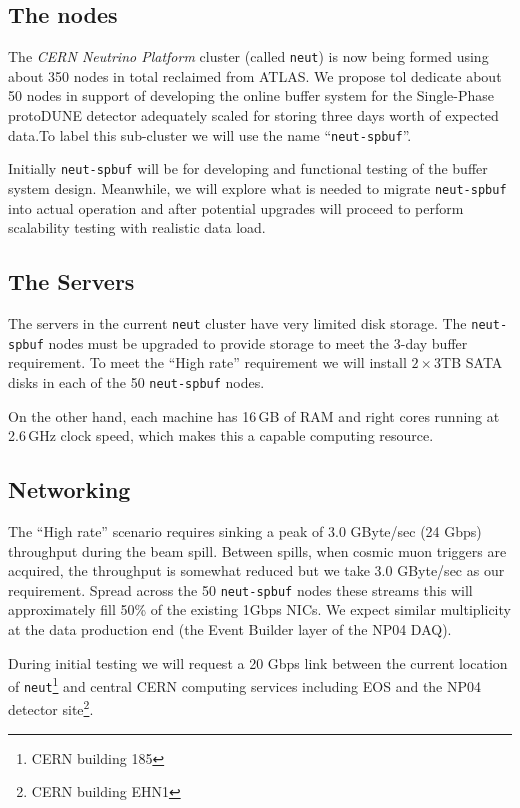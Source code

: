 \documentclass[pdftex,12pt,letter]{article}
\begin{document}
\subsection{The nodes}

The \textit{CERN Neutrino Platform} cluster (called \texttt{neut}) is now being formed using about 350 nodes in
total reclaimed from ATLAS.  We propose tol dedicate about 50 nodes in
support of developing the online buffer system for the Single-Phase
protoDUNE detector adequately scaled for storing three days worth of
expected data.To label this sub-cluster we will use the name ``\texttt{neut-spbuf}''.

Initially \texttt{neut-spbuf} will be for developing and functional testing of the buffer system design. 
Meanwhile, we will explore what is needed to migrate \texttt{neut-spbuf} into actual
operation and after potential upgrades will proceed to perform scalability testing with realistic data load.

\subsection{The Servers}

The servers in the current \texttt{neut} cluster have very limited disk storage.  The
\texttt{neut-spbuf} nodes must be upgraded to provide storage to meet
the 3-day buffer requirement. To meet the ``High rate'' requirement we
will install $2\times 3$TB SATA disks in each of the 50
\texttt{neut-spbuf} nodes.

On the other hand, each machine has 16\,GB of RAM and right cores running at 2.6\,GHz clock speed,
which makes this a capable computing resource.

\subsection{Networking}

The ``High rate'' scenario requires sinking a peak of 3.0 GByte/sec
(24 Gbps) throughput during the beam spill.  Between spills, when
cosmic muon triggers are acquired, the throughput is somewhat reduced
but we take 3.0 GByte/sec as our requirement.  Spread across the 50
\texttt{neut-spbuf} nodes these streams this will approximately fill
50\% of the existing 1Gbps NICs.  We expect similar multiplicity at
the data production end (the Event Builder layer of the NP04 DAQ).

During initial testing we will request a 20 Gbps link between the
current location of \texttt{neut}\footnote{CERN building 185} and
central CERN computing services including EOS and the NP04 detector
site\footnote{CERN building EHN1}.
\end{document}
